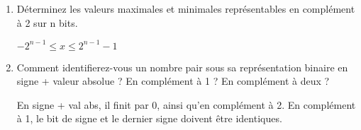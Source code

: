 \documentclass[a4paper,10pt]{exam}
\begin{document}
\begin{enumerate}
Quel est le nombre minimal de bits pouvant repr\'esenter x en compl\'ement \`a 2 ? M\^eme question pour y et z.

\begin{solution}
$x=1111111110010101$, $y=0000000000010010$, $z=1111111111101011$

Pour x, 8 bits. Pour y et z, 6 bits.

\end{solution}

\item D\'eterminez les valeurs maximales et minimales repr\'esentables en compl\'ement \`a 2 sur n bits.

\begin{solution}
$-2^{n-1} \leq x \leq 2^{n-1}-1$

\end{solution}

\item Comment identifierez-vous un nombre pair sous sa repr\'esentation binaire en signe + valeur absolue ? En compl\'ement \`a 1 ? En compl\'ement \`a deux ?

\begin{solution}
En signe + val abs, il finit par 0, ainsi qu'en compl\'ement \`a 2. En compl\'ement \`a 1, le bit de signe et le dernier signe doivent \^etre identiques.
\end{solution}

\end{enumerate}
\end{document}
